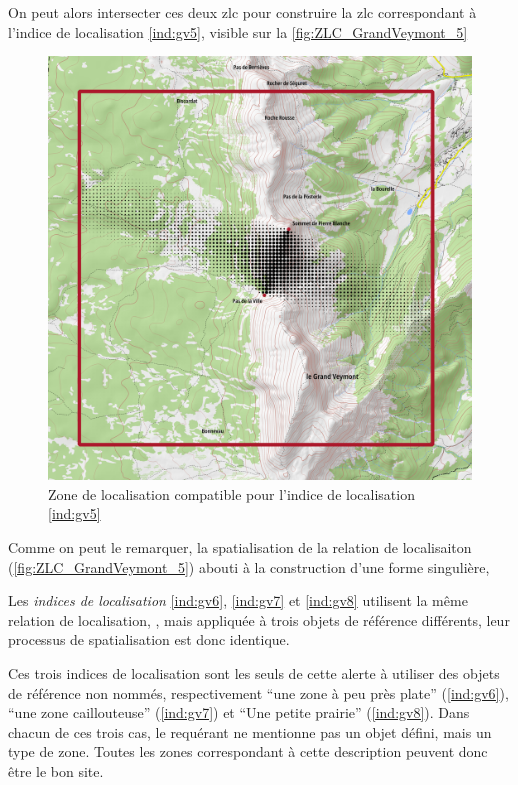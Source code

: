 On peut alors intersecter ces deux \ac{zlc} pour construire la
\ac{zlc} correspondant à l'indice de localisation \ref{ind:gv5},
visible sur la \autoref{fig:ZLC_GrandVeymont_5}

\begin{figure}
  \centering
  \includegraphics{../figures/EntreGrandVeymont.png}
  \caption{Zone de localisation compatible pour l'indice de
    localisation \ref{ind:gv5}}
  \label{fig:ZLC_GrandVeymont_5}
\end{figure}

Comme on peut le remarquer, la spatialisation de la relation de
localisaiton 
(\autoref{fig:ZLC_GrandVeymont_5}) abouti à la construction d'une
forme singulière, 


Les \emph{indices de localisation} \ref{ind:gv6}, \ref{ind:gv7} et
\ref{ind:gv8} utilisent la même relation de localisation,
, mais appliquée à trois objets de
référence différents, leur processus de spatialisation est donc
identique.

Ces trois indices de localisation sont les seuls de cette alerte à
utiliser des objets de référence non nommés, respectivement
\enquote{une zone à peu près plate} (\ref{ind:gv6}), \enquote{une zone
  caillouteuse} (\ref{ind:gv7}) et \enquote{Une petite prairie}
(\ref{ind:gv8}). Dans chacun de ces trois cas, le requérant ne
mentionne pas un objet défini, mais un type de zone. Toutes les zones
correspondant à cette description peuvent donc être le bon site.

